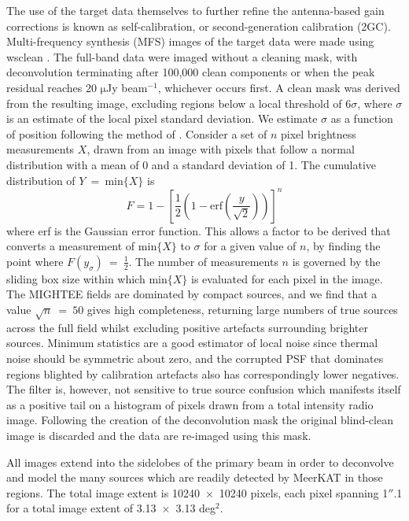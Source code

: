 \documentclass[usenatbib,usedcolumn]{mnras}
\begin{document}
The use of the target data themselves to further refine the antenna-based gain corrections is known as self-calibration, or second-generation calibration (2GC). Multi-frequency synthesis (MFS) images of the target data were made using {\sc wsclean} \citep{offringa2014}. The full-band data were imaged without a cleaning mask, with deconvolution terminating after 100,000 clean components or when the peak residual reaches 20 $\mathrm{\mu}$Jy beam$^{-1}$, whichever occurs first. A clean mask was derived from the resulting image, excluding regions below a local threshold of 6$\sigma$, where $\sigma$ is an estimate of the local pixel standard deviation. We estimate $\sigma$ as a function of position following the method of \citet{tasse2020}. Consider a set of $n$ pixel brightness measurements $X$, drawn from an image with pixels that follow a normal distribution with a mean of 0 and a standard deviation of 1. The cumulative distribution of $Y$~=~$\mathrm{min}\{X\}$ is
\begin{equation}
F = 1 - \left[\frac{1}{2}\left(1 - \mathrm{erf}\left(\frac{y}{\sqrt{2}} \right) \right) \right]^{n}
\end{equation}
where erf is the Gaussian error function. This allows a factor to be derived that converts a measurement of $\mathrm{min}\{X\}$ to $\sigma$ for a given value of $n$, by finding the point where $F(y_{\sigma})~=~\frac{1}{2}$. The number of measurements $n$ is governed by the sliding box size within which $\mathrm{min}\{X\}$ is evaluated for each pixel in the image. The MIGHTEE fields are dominated by compact sources, and we find that a value $\sqrt{n}~=~50$ gives high completeness, returning large numbers of true sources across the full field whilst excluding positive artefacts surrounding brighter sources. Minimum statistics are a good estimator of local noise since thermal noise should be symmetric about zero, and the corrupted PSF that dominates regions blighted by calibration artefacts also has correspondingly lower negatives. The filter is, however, not sensitive to true source confusion which manifests itself as a positive tail on a histogram of pixels drawn from a total intensity radio image. Following the creation of the deconvolution mask the original blind-clean image is discarded and the data are re-imaged using this mask. 

All images extend into the sidelobes of the primary beam in order to deconvolve and model the many sources which are readily detected by MeerKAT in those regions. The total image extent is 10240~$\times$~10240 pixels, each pixel spanning 1$''$.1 for a total image extent of 3.13~$\times$~3.13 deg$^{2}$.
\end{document}
